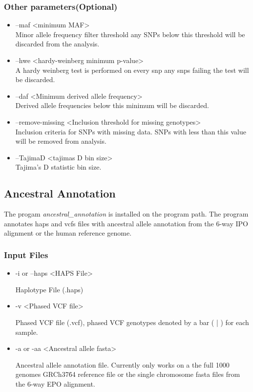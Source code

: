 \documentclass[a4paper,10pt]{article}
\begin{document}
\subsubsection{Other parameters(Optional)}
\begin{itemize}
\item --maf <minimum MAF>\\
Minor allele frequency filter threshold any SNPs below this threshold will be discarded from the analysis.
\item --hwe <hardy-weinberg minimum p-value>\\
A hardy weinberg test is performed on every snp any snps failing the test will be discarded.
\item --daf <Minimum derived allele frequency>\\
Derived allele frequencies below this minimum will be discarded.
\item --remove-missing <Inclusion threshold for missing genotypes>\\
Inclusion criteria for SNPs with missing data. SNPs with less than this value will be removed from analysis.
\item --TajimaD <tajimas D bin size>\\
Tajima's D statistic bin size.
\end{itemize}
\subsection{Ancestral Annotation}
The progam \emph{ancestral\_annotation} is installed on the program path. The program annotates haps and vcfs files with ancestral allele annotation from the 6-way IPO alignment or the human reference genome.
\subsubsection{Input Files}
\begin{itemize}
\item -i or --haps <HAPS File>

Haplotype File (.haps)

\item -v <Phased VCF file>

Phased VCF file (.vcf), phased VCF genotypes denoted by a bar ( | ) for each sample.
\item -a or -aa <Ancestral allele fasta>

Ancestral allele annotation file. Currently only works on a the full 1000 genomes GRCh37\.64 reference file or the single chromosome fasta files from the 6-way EPO alignment.
\end{itemize}
\end{document}
